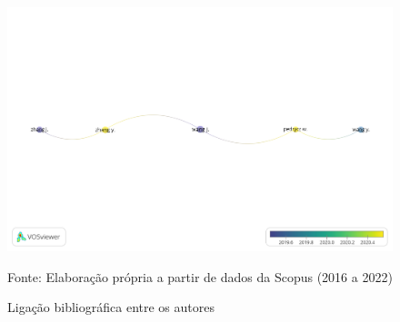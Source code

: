 \begin{figure}[htp!]
	\centering
	\caption{Ligação bibliográfica entre os autores}
	\label{fig:autores}
	\includegraphics[width=0.8\linewidth]{Revisao/Figuras/Autores}
	
	\vspace{0.2cm}
	Fonte: Elaboração própria a partir de dados da Scopus (2016 a 2022)
\end{figure}